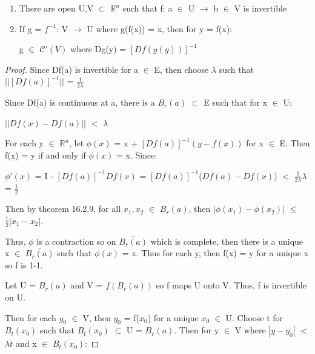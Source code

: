     \begin{enumerate}[label=(\alph*), leftmargin=2.5cm, itemsep=0.1cm]
        \item There are open U,V $\subset$ $\mathbb{R}^n$ such that
            f: a $\in$ U $\rightarrow$ b $\in$ V is invertible 

        \item If g = $f^{-1}$: V $\rightarrow$ U where g(f(x)) = x,
            then for y = f(x):
            
            \hspace{0.5cm}
            g $\in$ $\mathscr{C}'(V)$ where Dg(y) = $[Df(g(y))]^{-1}$
    \end{enumerate}

    \begin{proof}
        Since Df(a) is invertible for a $\in$ E, then choose $\lambda$
        such that $||[Df(a)]^{-1}||$ = $\frac{1}{2\lambda}$

        Since Df(a) is continuous at a, there is a $B_r(a)$ $\subset$ E
        such that for x $\in$ U:
        
        \hspace{0.5cm}
        $||Df(x) - Df(a)||$ $<$ $\lambda$

        For each y $\in$ $\mathbb{R}^n$, let
        $\phi(x)$ = x + $[Df(a)]^{-1}(y - f(x))$ for x $\in$ E.
        Then f(x) = y if and only if $\phi(x)$ = x. Since:

        \hspace{0.5cm}
        $\phi'(x)$
        = I - $[Df(a)]^{-1}Df(x)$
        = $[Df(a)]^{-1}$($Df(a) - Df(x)$)
        $<$ $\frac{1}{2\lambda}\lambda$ = $\frac{1}{2}$

        Then by {\color{red} theorem 16.2.9},
        for all $x_1,x_2$ $\in$ $B_r(a)$, then
        $|\phi(x_1) - \phi(x_2)|$ $\leq$ $\frac{1}{2}|x_1 - x_2|$.

        Thus, $\phi$ is a contraction so on $\overline{B_r(a)}$
        which is complete, then there is a unique x $\in$ $\overline{B_r(a)}$
        such that $\phi(x)$ = x. Thus for each y, then f(x) = y for a unique x
        so f is 1-1.
        
        Let U = $B_r(a)$ and V = $f(B_r(a))$ so f maps U onto V.
        Thus, f is invertible on U.

        Then for each $y_0$ $\in$ V, then $y_0$ = f($x_0$) for a
        unique $x_0$ $\in$ U. Choose t for $B_t(x_0)$ such that
        $\overline{B_t(x_0)}$ $\subset$ U = $B_r(a)$.
        Then for y $\in$ V where $|y - y_0|$ $<$ $\lambda t$
        and x $\in$ $\overline{B_t(x_0)}$:


\end{proof}

